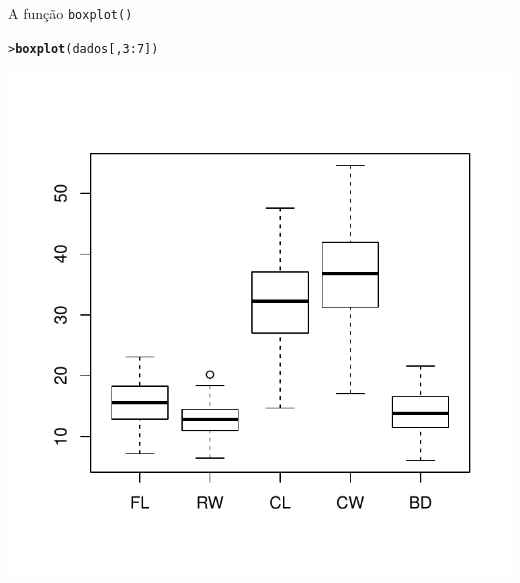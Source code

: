 \documentclass[10pt]{beamer}\usepackage{graphicx, color}
\makeatletter
\newcommand{\hlfunctioncall}[1]{\textcolor[rgb]{0,0,0.545098039215686}{\textbf{#1}}}%
\newenvironment{kframe}{%
 \def\at@end@of@kframe{}%
 \ifinner\ifhmode%
  \def\at@end@of@kframe{\end{minipage}}%
  \begin{minipage}{\columnwidth}%
 \fi\fi%
 \def\FrameCommand##1{\hskip\@totalleftmargin \hskip-\fboxsep
 \colorbox{shadecolor}{##1}\hskip-\fboxsep
     \hskip-\linewidth \hskip-\@totalleftmargin \hskip\columnwidth}%
 \MakeFramed {\advance\hsize-\width
   \@totalleftmargin\z@ \linewidth\hsize
   \@setminipage}}%
 {\par\unskip\endMakeFramed%
 \at@end@of@kframe}
\newenvironment{knitrout}{}{} %
\makeatother
\begin{document}

\begin{frame}[fragile=singleslide]{A função \texttt{boxplot()}}
\begin{knitrout}\small
{}\color{fgcolor}\begin{kframe}
\begin{alltt}
> \hlfunctioncall{boxplot}(dados[, 3:7])
\end{alltt}
\end{kframe}

{\centering \includegraphics[width=.7\textwidth]{figure/unnamed-chunk-29} 

}


\end{knitrout}

\end{frame}
\end{document}
